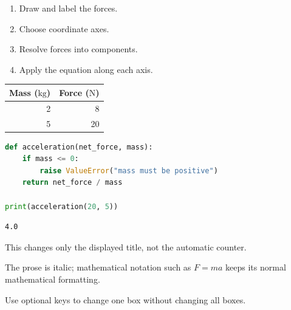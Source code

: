 \documentclass[11pt]{article}
\begin{document}
\begin{procedurebox}
\begin{enumerate}
  \item Draw and label the forces.
  \item Choose coordinate axes.
  \item Resolve forces into components.
  \item Apply the equation along each axis.
\end{enumerate}
\end{procedurebox}

\begin{databox}[title={Measurements}]
\centering
\begin{tabular}{rr}
\toprule
Mass ($\mathrm{kg}$) & Force ($\mathrm{N}$) \\
\midrule
2 & 8 \\
5 & 20 \\
\bottomrule
\end{tabular}
\end{databox}

\begin{codebox}[title={Python: acceleration}]
\begin{lstlisting}[style=notescode,language=Python]
def acceleration(net_force, mass):
    if mass <= 0:
        raise ValueError("mass must be positive")
    return net_force / mass

print(acceleration(20, 5))
\end{lstlisting}
\end{codebox}

\begin{outputbox}
\begin{lstlisting}[style=notescode]
4.0
\end{lstlisting}
\end{outputbox}

\begin{question}[title={Question 12: custom display title}]
This changes only the displayed title, not the automatic counter.
\end{question}
\begin{answer}
The prose is italic; mathematical notation such as $F=ma$ keeps its normal mathematical formatting.
\end{answer}

\begin{note}[title={A customized title},colback=green!10!white]
Use optional keys to change one box without changing all boxes.
\end{note}
\end{document}
